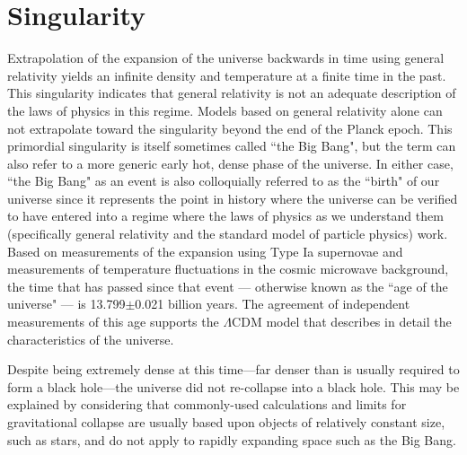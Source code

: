 \documentclass[14pt, oneside]{book}
\begin{document}
	\section{Singularity}
		Extrapolation of the expansion of the universe backwards in time using general relativity yields an infinite density and temperature at a finite time in the past. This singularity indicates that general relativity is not an adequate description of the laws of physics in this regime. Models based on general relativity alone can not extrapolate toward the singularity beyond the end of the Planck epoch.
		This primordial singularity is itself sometimes called ``the Big Bang", but the term can also refer to a more generic early hot, dense phase of the universe. In either case, ``the Big Bang" as an event is also colloquially referred to as the ``birth" of our universe since it represents the point in history where the universe can be verified to have entered into a regime where the laws of physics as we understand them (specifically general relativity and the standard model of particle physics) work. Based on measurements of the expansion using Type Ia supernovae and measurements of temperature fluctuations in the cosmic microwave background, the time that has passed since that event --- otherwise known as the ``age of the universe" --- is 13.799$\pm$0.021 billion years. The agreement of independent measurements of this age supports the $\Lambda$CDM model that describes in detail the characteristics of the universe.
		
		Despite being extremely dense at this time---far denser than is usually required to form a black hole---the universe did not re-collapse into a black hole. This may be explained by considering that commonly-used calculations and limits for gravitational collapse are usually based upon objects of relatively constant size, such as stars, and do not apply to rapidly expanding space such as the Big Bang.
	
\end{document}
